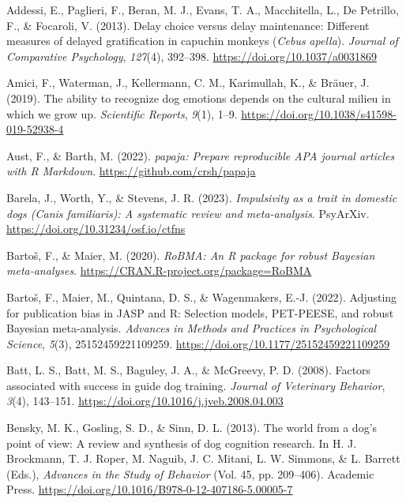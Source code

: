 \documentclass[
  ,pub,floatsintext]{apa6}
\newlength{\cslhangindent}
\newlength{\cslentryspacingunit} %
\newenvironment{CSLReferences}[2] %
 {%
  \setlength{\parindent}{0pt}
  \ifodd #1
  \let\oldpar\par
  \def\par{\hangindent=\cslhangindent\oldpar}
  \fi
  \setlength{\parskip}{#2\cslentryspacingunit}
 }%
 {}
\begin{document}
\hypertarget{refs}{}
\begin{CSLReferences}{1}{0}
\leavevmode{}%
Addessi, E., Paglieri, F., Beran, M. J., Evans, T. A., Macchitella, L., De Petrillo, F., \& Focaroli, V. (2013). Delay choice versus delay maintenance: {Different} measures of delayed gratification in capuchin monkeys ({\emph{Cebus}}{ \emph{apella}}). \emph{Journal of Comparative Psychology}, \emph{127}(4), 392--398. \url{https://doi.org/10.1037/a0031869}

\leavevmode{}%
Amici, F., Waterman, J., Kellermann, C. M., Karimullah, K., \& Bräuer, J. (2019). The ability to recognize dog emotions depends on the cultural milieu in which we grow up. \emph{Scientific Reports}, \emph{9}(1), 1--9. \url{https://doi.org/10.1038/s41598-019-52938-4}

\leavevmode{}%
Aust, F., \& Barth, M. (2022). \emph{{papaja}: {Prepare} reproducible {APA} journal articles with {R Markdown}}. \url{https://github.com/crsh/papaja}

\leavevmode{}%
Barela, J., Worth, Y., \& Stevens, J. R. (2023). \emph{Impulsivity as a trait in domestic dogs ({Canis} familiaris): {A} systematic review and meta-analysis}. {PsyArXiv}. \url{https://doi.org/10.31234/osf.io/ctfns}

\leavevmode{}%
Bartoš, F., \& Maier, M. (2020). \emph{RoBMA: An {R} package for robust {Bayesian} meta-analyses}. \url{https://CRAN.R-project.org/package=RoBMA}

\leavevmode{}%
Bartoš, F., Maier, M., Quintana, D. S., \& Wagenmakers, E.-J. (2022). Adjusting for publication bias in {JASP} and {R}: Selection models, {PET-PEESE}, and robust {Bayesian} meta-analysis. \emph{Advances in Methods and Practices in Psychological Science}, \emph{5}(3), 25152459221109259. \url{https://doi.org/10.1177/25152459221109259}

\leavevmode{}%
Batt, L. S., Batt, M. S., Baguley, J. A., \& McGreevy, P. D. (2008). Factors associated with success in guide dog training. \emph{Journal of Veterinary Behavior}, \emph{3}(4), 143--151. \url{https://doi.org/10.1016/j.jveb.2008.04.003}

\leavevmode{}%
Bensky, M. K., Gosling, S. D., \& Sinn, D. L. (2013). The world from a dog's point of view: A review and synthesis of dog cognition research. In H. J. Brockmann, T. J. Roper, M. Naguib, J. C. Mitani, L. W. Simmons, \& L. Barrett (Eds.), \emph{Advances in the {Study} of {Behavior}} (Vol. 45, pp. 209--406). {Academic Press}. \url{https://doi.org/10.1016/B978-0-12-407186-5.00005-7}


\end{CSLReferences}
\end{document}
